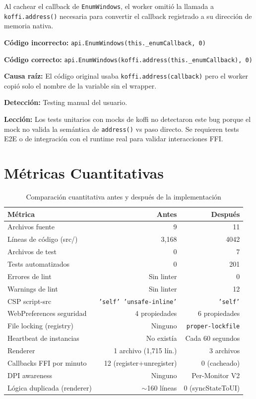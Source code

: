 \documentclass[12pt,a4paper]{article}
\begin{document}
\begin{regressionbox}
Al cachear el callback de \texttt{EnumWindows}, el worker omiti\'o la llamada a \texttt{koffi.address()} necesaria para convertir el callback registrado a su direcci\'on de memoria nativa.

\textbf{C\'odigo incorrecto:} \texttt{api.EnumWindows(this.\_enumCallback, 0)}

\textbf{C\'odigo correcto:} \texttt{api.EnumWindows(koffi.address(this.\_enumCallback), 0)}

\textbf{Causa ra\'iz:} El c\'odigo original usaba \texttt{koffi.address(callback)} pero el worker copi\'o solo el nombre de la variable sin el wrapper.

\textbf{Detecci\'on:} Testing manual del usuario.

\textbf{Lecci\'on:} Los tests unitarios con mocks de koffi no detectaron este bug porque el mock no valida la sem\'antica de \texttt{address()} vs paso directo. Se requieren tests E2E o de integraci\'on con el runtime real para validar interacciones FFI.
\end{regressionbox}

\section{M\'etricas Cuantitativas}

\begin{table}[H]
\centering
\renewcommand{\arraystretch}{1.5}
\begin{tabularx}{\textwidth}{X r r}
\toprule
\textbf{M\'etrica} & \textbf{Antes} & \textbf{Despu\'es} \\
\midrule
Archivos fuente & 9 & 11 \\
L\'ineas de c\'odigo (src/) & 3,168 & 4042 \\
Archivos de test & 0 & 7 \\
Tests automatizados & 0 & 201 \\
Errores de lint & Sin linter & 0 \\
Warnings de lint & Sin linter & 12 \\
CSP script-src & \texttt{'self' 'unsafe-inline'} & \texttt{'self'} \\
WebPreferences seguridad & 4 propiedades & 6 propiedades \\
File locking (registry) & Ninguno & \texttt{proper-lockfile} \\
Heartbeat de instancias & No exist\'ia & Cada 60 segundos \\
Renderer & 1 archivo (1,715 l\'in.) & 3 archivos \\
Callbacks FFI por minuto & 12 (register+unregister) & 0 (cacheado) \\
DPI awareness & Ninguno & Per-Monitor V2 \\
L\'ogica duplicada (renderer) & $\sim$160 l\'ineas & 0 (syncStateToUI) \\
\bottomrule
\end{tabularx}
\caption{Comparaci\'on cuantitativa antes y despu\'es de la implementaci\'on}
\end{table}
\end{document}

